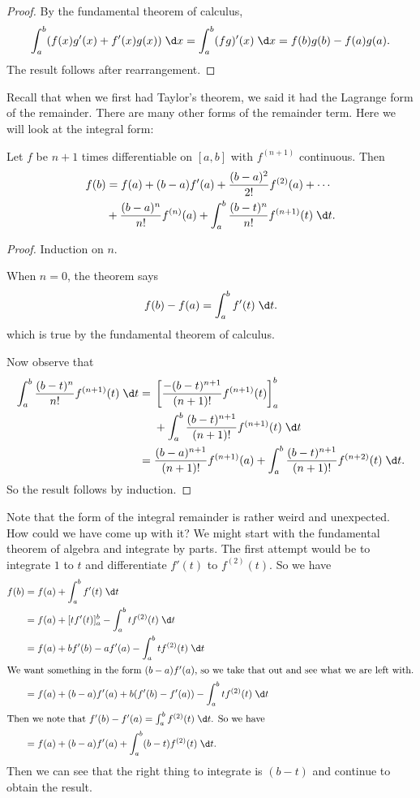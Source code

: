 \documentclass[a4paper]{article}
\begin{document}
\begin{proof}
  By the fundamental theorem of calculus,
  \[
    \int_a^b (f(x)g'(x) + f'(x)g(x))\;\d x = \int_a^b(fg)'(x)\;\d x = f(b)g(b) - f(a)g(a).
  \]
  The result follows after rearrangement.
\end{proof}

Recall that when we first had Taylor's theorem, we said it had the Lagrange form of the remainder. There are many other forms of the remainder term. Here we will look at the integral form:
\begin{thm}
  Let $f$ be $n + 1$ times differentiable on $[a, b]$ with $f^{(n + 1)}$ continuous. Then
  \begin{align*}
    f(b) &= f(a) + (b - a)f'(a) + \frac{(b - a)^2}{2!}f^{(2)}(a) + \cdots \\
    &+ \frac{(b - a)^n}{n!}f^{(n)}(a) + \int_a^b \frac{(b - t)^n}{n!}f^{(n + 1)}(t)\;\d t.
  \end{align*}
\end{thm}
\begin{proof}
  Induction on $n$.

  When $n = 0$, the theorem says
  \[
    f(b) - f(a) = \int_a^b f'(t)\;\d t.
  \]
  which is true by the fundamental theorem of calculus.

  Now observe that
  \begin{align*}
    \int_a^b \frac{(b - t)^n}{n!}f^{(n + 1)}(t)\;\d t ={}& \left[\frac{-(b - t)^{n + 1}}{(n + 1)!}f^{(n + 1)}(t)\right]_a^b\\
    &+ \int_a^b \frac{(b - t)^{n + 1}}{(n + 1)!}f^{(n + 1)}(t)\;\d t \\
    ={}& \frac{(b - a)^{n + 1}}{(n + 1)!} f^{(n + 1)}(a) + \int_a^b \frac{(b - t)^{n + 1}}{(n + 1)!}f^{(n + 2)}(t)\;\d t.
  \end{align*}
  So the result follows by induction.
\end{proof}
Note that the form of the integral remainder is rather weird and unexpected. How could we have come up with it? We might start with the fundamental theorem of algebra and integrate by parts. The first attempt would be to integrate $1$ to $t$ and differentiate $f'(t)$ to $f^{(2)}(t)$. So we have
\begin{align*}
  f(b) &= f(a) + \int_a^b f'(t)\;\d t\\
  &= f(a) + [tf'(t)]_a^b - \int_a^b tf^{(2)}(t)\;\d t\\
  &= f(a) + bf'(b) - af'(a) - \int_a^b tf^{(2)}(t)\;\d t\\
  \intertext{We want something in the form $(b - a)f'(a)$, so we take that out and see what we are left with.}
  &= f(a) + (b - a)f'(a) + b(f'(b) - f'(a)) - \int_a^b tf^{(2)}(t)\;\d t\\
  \intertext{Then we note that $f'(b) - f'(a) = \int_a^b f^{(2)}(t)\;\d t$. So we have}
  &= f(a) + (b - a)f'(a) + \int_a^b (b - t)f^{(2)}(t)\;\d t.
\end{align*}
Then we can see that the right thing to integrate is $(b - t)$ and continue to obtain the result.
\end{document}

